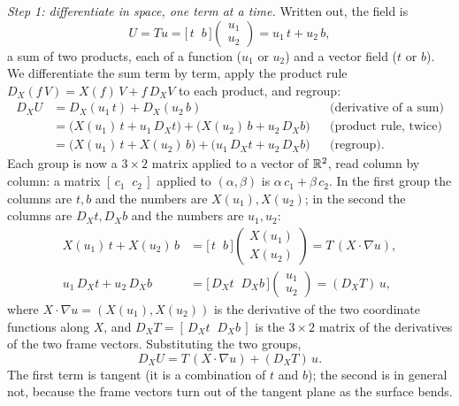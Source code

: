 \emph{Step 1: differentiate in space, one term at a time.} Written out, the field is
\begin{equation*}
U = T u = \big[\, t \;\; b \,\big] \begin{pmatrix} u_1 \\ u_2 \end{pmatrix} = u_1\, t + u_2\, b ,
\end{equation*}
a sum of two products, each of a function ($u_1$ or $u_2$) and a vector field ($t$ or $b$). We differentiate the sum term by term, apply the product rule $D_X(f\,V) = X(f)\,V + f\,D_X V$ to each product, and regroup:
\begin{align*}
D_X U &= D_X (u_1\, t) + D_X (u_2\, b) && \text{(derivative of a sum)} \\
&= \big( X(u_1)\, t + u_1\, D_X t \big) + \big( X(u_2)\, b + u_2\, D_X b \big) && \text{(product rule, twice)} \\
&= \big( X(u_1)\, t + X(u_2)\, b \big) + \big( u_1\, D_X t + u_2\, D_X b \big) && \text{(regroup)} .
\end{align*}
Each group is now a $3\times 2$ matrix applied to a vector of $\mathbb{R}^2$, read column by column: a matrix $[\,c_1\;\;c_2\,]$ applied to $(\alpha, \beta)$ is $\alpha\, c_1 + \beta\, c_2$. In the first group the columns are $t, b$ and the numbers are $X(u_1), X(u_2)$; in the second the columns are $D_X t, D_X b$ and the numbers are $u_1, u_2$:
\begin{align*}
X(u_1)\, t + X(u_2)\, b &= \big[\, t \;\; b \,\big] \begin{pmatrix} X(u_1) \\ X(u_2) \end{pmatrix} = T\, (X\cdot\nabla u) , \\
u_1\, D_X t + u_2\, D_X b &= \big[\, D_X t \;\; D_X b \,\big] \begin{pmatrix} u_1 \\ u_2 \end{pmatrix} = (D_X T)\, u ,
\end{align*}
where $X\cdot\nabla u = (X(u_1), X(u_2))$ is the derivative of the two coordinate functions along $X$, and $D_X T = [\,D_X t \;\; D_X b\,]$ is the $3 \times 2$ matrix of the derivatives of the two frame vectors. Substituting the two groups,
\begin{equation*}
D_X U = T\,(X\cdot\nabla u) + (D_X T)\, u .
\end{equation*}
The first term is tangent (it is a combination of $t$ and $b$); the second is in general not, because the frame vectors turn out of the tangent plane as the surface bends.

